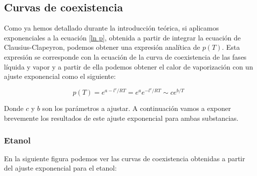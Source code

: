 \documentclass[a4paper,12pt,titlepage]{article}
\begin{document}
\subsection{Curvas de coexistencia}

Como ya hemos detallado durante la introducción teórica, si aplicamos exponenciales a la ecuación \ref{ln p}, obtenida a partir de integrar la ecuación de Clausius-Clapeyron, podemos obtener una expresión analítica de $p(T)$. Esta expresión se corresponde con la ecuación de la curva de coexistencia de las fases líquida y vapor y a partir de ella podemos obtener el calor de vaporización con un ajuste exponencial como el siguiente:

\begin{equation}
    p(T) = e^{a-l^v/RT} = e^{a}e^{-l^v/RT} \sim ce^{b/T}
    \label{p(T)}
\end{equation}

Donde $c$ y $b$ son los parámetros a ajustar. A continuación vamos a exponer brevemente los resultados de este ajuste exponencial para ambas substancias.

\subsubsection{Etanol}

En la siguiente figura podemos ver las curvas de coexistencia obtenidas a partir del ajuste exponencial para el etanol:
\end{document}

